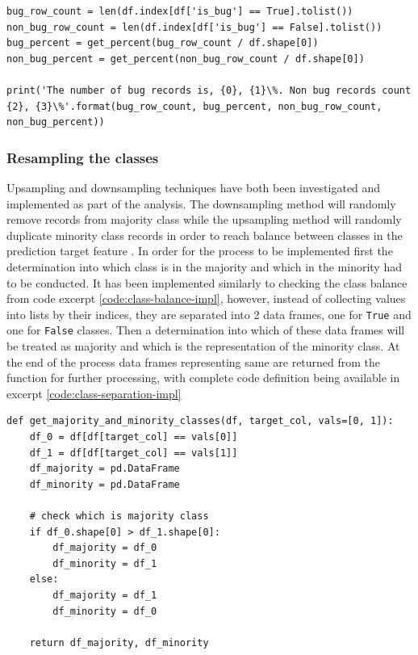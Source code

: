 \begin{code}
\label{code:class-balance-impl}
\begin{verbatim}
bug_row_count = len(df.index[df['is_bug'] == True].tolist())
non_bug_row_count = len(df.index[df['is_bug'] == False].tolist())
bug_percent = get_percent(bug_row_count / df.shape[0])
non_bug_percent = get_percent(non_bug_row_count / df.shape[0])

print('The number of bug records is, {0}, {1}\%. Non bug records count {2}, {3}\%'.format(bug_row_count, bug_percent, non_bug_row_count, non_bug_percent))
\end{verbatim}
\end{code}

\subsubsection{Resampling the classes}\label{sec:impl-data-analysis:resampling}
Upsampling and downsampling techniques have both been investigated and implemented as part of the analysis. The downsampling method will randomly remove records from majority class while the upsampling method will randomly duplicate minority class records in order to reach balance between classes in the prediction target feature \isBug{}. In order for the process to be implemented first the determination into which class is in the majority and which in the minority had to be conducted. It has been implemented similarly to checking the class balance from code excerpt \ref{code:class-balance-impl}, however, instead of collecting values into lists by their indices, they are separated into 2 data frames, one for \texttt{True} and one for \texttt{False} classes. Then a determination into which of these data frames will be treated as majority and which is the representation of the minority class. At the end of the process data frames representing same are returned from the function for further processing, with complete code definition being available in excerpt \ref{code:class-separation-impl}
\begin{code}
\label{code:class-separation-impl}
\begin{verbatim}
def get_majority_and_minority_classes(df, target_col, vals=[0, 1]):
    df_0 = df[df[target_col] == vals[0]]
    df_1 = df[df[target_col] == vals[1]]
    df_majority = pd.DataFrame
    df_minority = pd.DataFrame

    # check which is majority class
    if df_0.shape[0] > df_1.shape[0]:
        df_majority = df_0
        df_minority = df_1
    else:
        df_majority = df_1
        df_minority = df_0

    return df_majority, df_minority
\end{verbatim}
\end{code}

